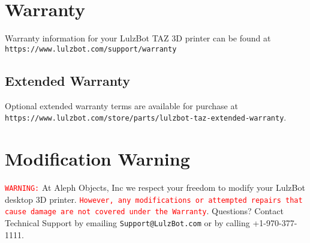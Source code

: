 %
%
%
%
%

\section{Warranty}
Warranty information for your LulzBot TAZ 3D printer can be found at \texttt{https://www.lulzbot.com/support/warranty}

\subsection{Extended Warranty}
Optional extended warranty terms are available for purchase at \texttt{https://www.lulzbot.com/store/parts/lulzbot-taz-extended-warranty}.

\section{Modification Warning}
\textcolor{red}{\texttt{WARNING:}} At Aleph Objects, Inc we respect your freedom to modify your LulzBot desktop 3D printer. \textcolor{red}{\texttt{However, any modifications or attempted repairs that cause damage are not covered under the Warranty}}. Questions? Contact Technical Support by emailing \texttt{Support@LulzBot.com} or by calling +1-970-377-1111.
